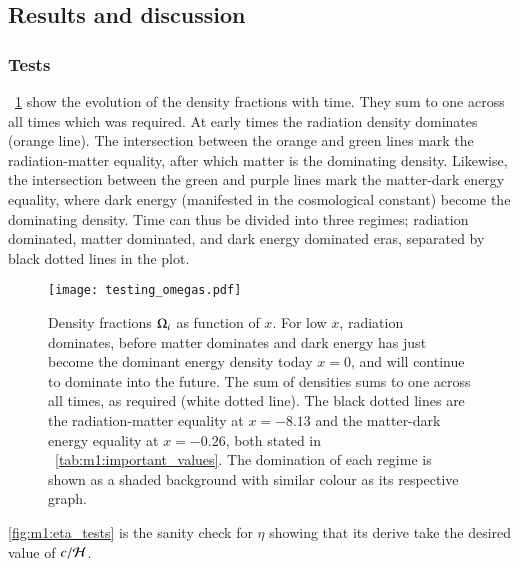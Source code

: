 \subsection{Results and discussion}\label{sec:m1:results}

\subsubsection{Tests}\label{sec:m1:results:tests}
    ~\cref{fig:m1:omega_tests} show the evolution of the density fractions with time. They sum to one across all times which was required. At early times the radiation density dominates (orange line). The intersection between the orange and green lines mark the radiation-matter equality, after which matter is the dominating density. Likewise, the intersection between the green and purple lines mark the matter-dark energy equality, where dark energy (manifested in the cosmological constant) become the dominating density. Time can thus be divided into three regimes; radiation dominated, matter dominated, and dark energy dominated eras, separated by black dotted lines in the plot. 
    \begin{figure}
        \texttt{[image: testing\_omegas.pdf]}
        \caption{Density fractions $\Omega_i$ as function of $x$. For low $x$, radiation dominates, before matter dominates and dark energy has just become the dominant energy density today $x=0$, and will continue to dominate into the future. The sum of densities sums to one across all times, as required (white dotted line). The black dotted lines are the radiation-matter equality at $x=-8.13$ and the matter-dark energy equality at $x=-0.26$, both stated in ~\cref{tab:m1:important_values}. The domination of each regime is shown as a shaded background with similar colour as its respective graph. }
        \label{fig:m1:omega_tests}
    \end{figure}
    \cref{fig:m1:eta_tests} is the sanity check for $\eta$ showing that its derive take the desired value of $c/\mathcal{H}$.
    
    

